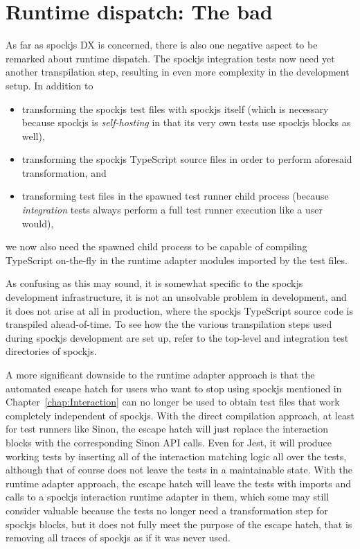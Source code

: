 \section{Runtime dispatch: The bad}
As far as spockjs DX is concerned,
there is also one negative aspect to be remarked about runtime dispatch.
The spockjs integration tests now need yet another transpilation step,
resulting in even more complexity in the development setup.
In addition to
\begin{itemize}
  \item transforming the spockjs test files with spockjs itself
    (which is necessary because spockjs is \textit{self-hosting}
    in that its very own tests use spockjs blocks as well),
  \item transforming the spockjs TypeScript source files
    in order to perform aforesaid transformation, and
  \item transforming test files in the spawned test runner child process
    (because \textit{integration} tests always perform
    a full test runner execution like a user would),
\end{itemize}
we now also need the spawned child process
to be capable of compiling TypeScript on-the-fly
in the runtime adapter modules imported by the test files.

As confusing as this may sound,
it is somewhat specific to the spockjs development infrastructure,
it is not an unsolvable problem in development, and
it does not arise at all in production,
where the spockjs TypeScript source code is transpiled ahead-of-time.
To see how the the various transpilation steps
used during spockjs development are set up,
refer to the top-level and integration test directories of spockjs.
\autocite{SpockjsGithubRuntimeDispatch}

A more significant downside to the runtime adapter approach is
that the automated escape hatch
for users who want to stop using spockjs
mentioned in Chapter~\ref{chap:Interaction}
can no longer be used to obtain test files
that work completely independent of spockjs.
With the direct compilation approach,
at least for test runners like Sinon,
the escape hatch will just
replace the interaction blocks
with the corresponding Sinon API calls.
Even for Jest, it will produce working tests
by inserting all of the interaction matching logic all over the tests,
although that of course does not
leave the tests in a maintainable state.
With the runtime adapter approach,
the escape hatch will leave the tests
with imports and calls to
a spockjs interaction runtime adapter in them,
which some may still consider valuable
because the tests no longer need
a transformation step for spockjs blocks,
but it does not fully meet
the purpose of the escape hatch,
that is removing all traces of spockjs
as if it was never used.

